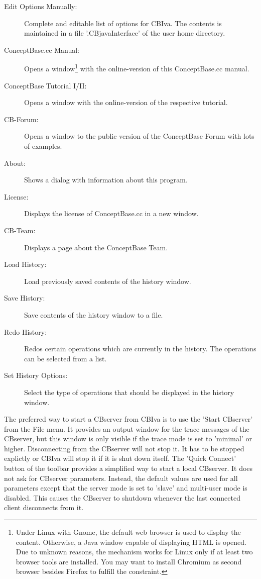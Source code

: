 \begin{description}
\begin{description}
	\item[Edit Options Manually:] Complete and editable list of options for CBIva. The contents
        is maintained in a file '.CBjavaInterface' of the user home directory.
	\end{description}
\item[Help:]
	\begin{description}
	\item[ConceptBase.cc Manual:] Opens a window\footnote{
Under Linux with Gnome, the default web browser is used to display the content. Otherwise, a Java window capable of
displaying HTML is opened. Due to unknown reasons, the mechanism works for Linux only if at least two browser tools are installed.
You may want to install Chromium as second browser besides Firefox to fulfill the constraint.}
with the online-version of this ConceptBase.cc manual.
	\item[ConceptBase Tutorial I/II:] Opens a window with the online-version of the respective tutorial.
	\item[CB-Forum:] Opens a window to the public version of the ConceptBase Forum with lots of
              examples.
	\item[About:] Shows a dialog with information about this program.
	\item[License:] Displays the license of ConceptBase.cc in a new window.
	\item[CB-Team:] Displays a page about the ConceptBase Team.
	\end{description}
\item[History:]
	\begin{description}
	\item[Load History:] Load previously saved contents of the history window.
	\item[Save History:] Save contents of the history window to a file.
	\item[Redo History:] Redos certain operations which are currently in the history. The operations
	can be selected from a list.
	\item[Set History Options:] Select the type of operations that should be displayed in the history window.
	\end{description}
\end{description}



The preferred way to start a CBserver from CBIva is to use the 'Start CBserver' from the File menu.
It provides an output window for the trace messages of the CBserver, but this window is only visible
if the trace mode is set to 'minimal' or higher. Disconnecting from the CBserver will not stop
it. It has to be stopped explictly or CBIva will stop it if it is shut down itself.
The 'Quick Connect' button of the toolbar provides a simplified way to start a local CBserver.
It does not ask for CBserver parameters. Instead, the default values are used for all parameters
except that the server mode is set to 'slave' and multi-user mode is disabled.
This causes the CBserver to shutdown whenever the last connected client disconnects from it.

